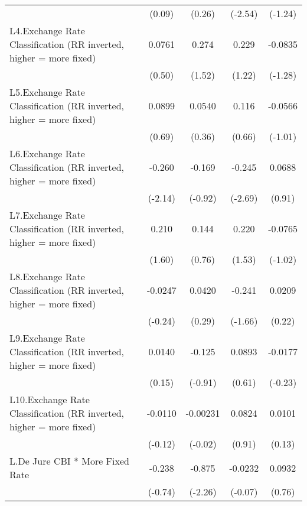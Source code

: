 {\begin{longtable}{l*{4}{c}}
                &   (0.09)         &   (0.26)         &  (-2.54)         &  (-1.24)         \\
[1em]
L4.Exchange Rate Classification (RR inverted, higher = more fixed)&   0.0761         &    0.274         &    0.229         &  -0.0835         \\
                &   (0.50)         &   (1.52)         &   (1.22)         &  (-1.28)         \\
[1em]
L5.Exchange Rate Classification (RR inverted, higher = more fixed)&   0.0899         &   0.0540         &    0.116         &  -0.0566         \\
                &   (0.69)         &   (0.36)         &   (0.66)         &  (-1.01)         \\
[1em]
L6.Exchange Rate Classification (RR inverted, higher = more fixed)&   -0.260\sym{*}  &   -0.169         &   -0.245\sym{**} &   0.0688         \\
                &  (-2.14)         &  (-0.92)         &  (-2.69)         &   (0.91)         \\
[1em]
L7.Exchange Rate Classification (RR inverted, higher = more fixed)&    0.210         &    0.144         &    0.220         &  -0.0765         \\
                &   (1.60)         &   (0.76)         &   (1.53)         &  (-1.02)         \\
[1em]
L8.Exchange Rate Classification (RR inverted, higher = more fixed)&  -0.0247         &   0.0420         &   -0.241         &   0.0209         \\
                &  (-0.24)         &   (0.29)         &  (-1.66)         &   (0.22)         \\
[1em]
L9.Exchange Rate Classification (RR inverted, higher = more fixed)&   0.0140         &   -0.125         &   0.0893         &  -0.0177         \\
                &   (0.15)         &  (-0.91)         &   (0.61)         &  (-0.23)         \\
[1em]
L10.Exchange Rate Classification (RR inverted, higher = more fixed)&  -0.0110         & -0.00231         &   0.0824         &   0.0101         \\
                &  (-0.12)         &  (-0.02)         &   (0.91)         &   (0.13)         \\
[1em]
L.De Jure CBI * More Fixed Rate&   -0.238         &   -0.875\sym{*}  &  -0.0232         &   0.0932         \\
                &  (-0.74)         &  (-2.26)         &  (-0.07)         &   (0.76)         \\

\end{longtable}}
